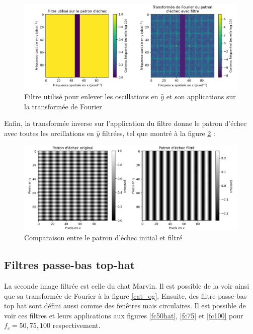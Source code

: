 \documentclass[11pt,letterpaper]{article}
\begin{document}
\begin{figure}[H]
  \centering
  \includegraphics[scale=0.68]{check_mask.png}
  \caption{Filtre utilisé pour enlever les oscillations en $\hat{y}$ et son applications sur la transformée de Fourier}
  \label{echec_filtre}
\end{figure}

Enfin, la transformée inverse sur l'application du filtre donne le patron d'échec avec toutes les orcillations en $\hat{y}$ filtrées, tel que montré à la figure \ref{echec_comp} :

\begin{figure}[H]
  \centering
  \includegraphics[scale=0.68]{check_filtre.png}
  \caption{Comparaison entre le patron d'échec initial et filtré}
  \label{echec_comp}
\end{figure}

\subsection{Filtres passe-bas top-hat}

La seconde image filtrée est celle du chat Marvin. Il est possible de la voir ainsi que sa transformée de Fourier à la figure \ref{cat_og}. Ensuite, des filtre passe-bas top hat sont défini aussi comme des fenêtres mais circulaires. Il est possible de voir ces filtres et leurs applications aux figures \ref{fc50hat}, \ref{fc75} et \ref{fc100} pour $f_c = 50, 75,100$ respectivement.
\end{document}
